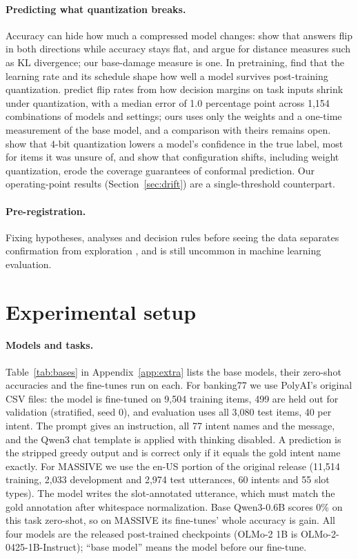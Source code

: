 \documentclass[10pt]{article}
\begin{document}
\paragraph{Predicting what quantization breaks.} Accuracy can hide how much a compressed model changes: \citet{dutta2024accuracy} show that answers flip in both directions while accuracy stays flat, and argue for distance measures such as KL divergence; our base-damage measure is one. In pretraining, \citet{catalan2025dynamics} find that the learning rate and its schedule shape how well a model survives post-training quantization. \citet{wu2026decisions} predict flip rates from how decision margins on task inputs shrink under quantization, with a median error of 1.0 percentage point across 1,154 combinations of models and settings; ours uses only the weights and a one-time measurement of the base model, and a comparison with theirs remains open. \citet{proskurina2024confidence} show that 4-bit quantization lowers a model's confidence in the true label, most for items it was unsure of, and \citet{zhu2026conformal} show that configuration shifts, including weight quantization, erode the coverage guarantees of conformal prediction. Our operating-point results (Section~\ref{sec:drift}) are a single-threshold counterpart.

\paragraph{Pre-registration.} Fixing hypotheses, analyses and decision rules before seeing the data separates confirmation from exploration \citep{nosek2018prereg}, and is still uncommon in machine learning evaluation.

\section{Experimental setup}
\label{sec:setup}

\paragraph{Models and tasks.} Table~\ref{tab:bases} in Appendix~\ref{app:extra} lists the base models, their zero-shot accuracies and the fine-tunes run on each. For banking77 we use PolyAI's original CSV files: the model is fine-tuned on 9,504 training items, 499 are held out for validation (stratified, seed 0), and evaluation uses all 3,080 test items, 40 per intent. The prompt gives an instruction, all 77 intent names and the message, and the Qwen3 chat template is applied with thinking disabled. A prediction is the stripped greedy output and is correct only if it equals the gold intent name exactly. For MASSIVE we use the en-US portion of the original release (11,514 training, 2,033 development and 2,974 test utterances, 60 intents and 55 slot types). The model writes the slot-annotated utterance, which must match the gold annotation after whitespace normalization. Base Qwen3-0.6B scores 0\% on this task zero-shot, so on MASSIVE its fine-tunes' whole accuracy is gain. All four models are the released post-trained checkpoints (OLMo-2 1B is OLMo-2-0425-1B-Instruct); ``base model'' means the model before our fine-tune.
\end{document}
